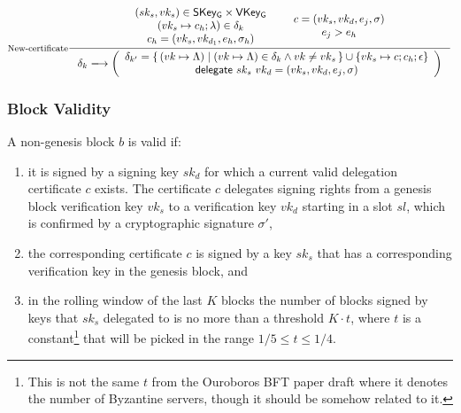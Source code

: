 \documentclass[11pt,a4paper]{article}
\newcommand\Set[2]{\{\,#1\mid#2\,\}}
\newcommand{\var}[1]{\mathit{#1}}
\newcommand{\fun}[1]{\mathsf{#1}}
\newcommand{\type}[1]{\mathsf{#1}}
\newcommand{\trans}[2]{\xlongrightarrow[\textsc{#1}]{#2}}
\newcommand{\SKeyGen}{\type{SKey_G}}
\newcommand{\VKeyGen}{\type{VKey_G}}
\newcommand{\delegatename}{delegate}
\newcommand{\delegate}[2]{\fun{\delegatename}\ #1 ~ #2}
\newcommand{\delmap}{\delta}
\newcommand{\partialf}{\mapsto}
\begin{document}
\begin{equation}
  \label{eq:new-del-cert}
  \inference[New-certificate]
  {
    {
      \begin{array}{c}
        (sk_s, vk_s) \in \SKeyGen \times \VKeyGen \\
        (vk_s \partialf c_h; \lambda) \in \delmap_k \\
        c_h = (vk_s, vk_{d_1}, e_h, \sigma_h)
      \end{array}
    }
    &
    {
      \begin{array}{c}
        c = (vk_s, vk_d, e_j, \sigma) \\
        e_j > e_h
      \end{array}
    }
  }
  {\delmap_k \trans{}{}
    \left(
    {
      \begin{array}{c}
        \delmap_{k'} = \Set{(vk \partialf \Lambda)}{(vk \partialf \Lambda) \in \delmap_k \wedge vk \neq vk_s} \cup \{vk_s \partialf c; c_h; \epsilon\} \\
        \delegate{sk_s}{vk_d} = (vk_s, vk_d, e_j, \sigma)
      \end{array}
    }
    \right)
  }
\end{equation}

\subsubsection{Block Validity}
\label{sec:block-valid}

A non-genesis block $\var{b}$ is valid if:
%
\begin{enumerate}
\item it is signed by a signing key $sk_d$ for which a current valid
  delegation certificate $c$ exists.
  The certificate $c$ delegates signing rights from a genesis block
  verification key $vk_s$ to a verification key $vk_d$ starting in a slot
  $sl$, which is confirmed by a cryptographic signature $\sigma'$,
\item the corresponding certificate $c$ is signed by a key $sk_s$ that has a
  corresponding verification key in the genesis block, and
\item in the rolling window of the last $K$ blocks the number of blocks signed
  by keys that $sk_s$ delegated to is no more than a threshold $K \cdot t$,
  where $t$ is a constant\footnote{This is not the same $t$ from the Ouroboros
    BFT paper draft where it denotes the number of Byzantine servers, though
    it should be somehow related to it.}  that will be picked in the range
  $1/5 \leq t \leq 1/4$.
\end{enumerate}
\end{document}
